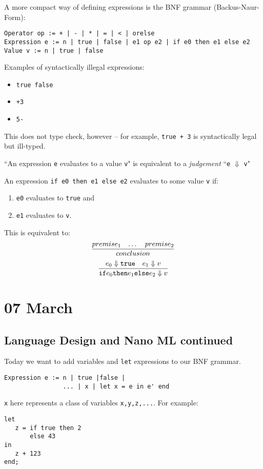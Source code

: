 \documentclass[11pt]{article}
\begin{document}
A more compact way of defining expressions is the BNF grammar (Backus-Naur-Form):
\begin{verbatim}
Operator op := + | - | * | = | < | orelse
Expression e := n | true | false | e1 op e2 | if e0 then e1 else e2
Value v := n | true | false
\end{verbatim}

Examples of syntactically illegal expressions:
\begin{itemize}
    \item \verb~true false~
    \item \verb~+3~
    \item \verb~5-~
\end{itemize}

This does not type check, however -- for example, \verb~true + 3~ is syntactically legal but ill-typed.

``An expression \verb~e~ evaluates to a value \verb~v~" is equivalent to a \emph{judgement} ``\verb~e~ $\Downarrow$ \verb~v~"

An expression \verb~if e0 then e1 else e2~ evaluates to some value \verb~v~ if:
\begin{enumerate}
    \item \verb~e0~ evaluates to \verb~true~ and
    \item \verb~e1~ evaluates to \verb~v~.
\end{enumerate}

This is equivalent to:
\[
    \infer{conclusion}{
        premise_1
        &
        \dots
        &
        premise_2
    }
\]
\[
    \infer{\verb~if~ e_0 \verb~then~ e_1 \verb~else~ e_2 \Downarrow v}{
        e_0 \Downarrow \verb~true~
        &
        e_1 \Downarrow v
    }
\]

\section{07 March}
\subsection{Language Design and Nano ML continued}

Today we want to add variables and \verb~let~ expressions to our BNF grammar.

\begin{verbatim}
Expression e := n | true |false |
                ... | x | let x = e in e' end
\end{verbatim}

\verb~x~ here represents a class of variables \verb~x,y,z,...~. For example:
\begin{verbatim}
let 
   z = if true then 2
       else 43
in 
   z + 123
end;
\end{verbatim}
\end{document}
